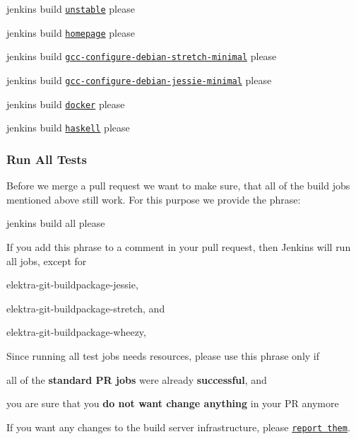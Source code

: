 \begin{DoxyItemize}
\item jenkins build \href{https://build.libelektra.org/job/elektra-mergerequests-unstable/}{\tt unstable} please
\item jenkins build \href{https://build.libelektra.org/job/elektra-homepage/}{\tt homepage} please
\item jenkins build \href{https://build.libelektra.org/job/elektra-gcc-configure-debian-stretch-minimal/}{\tt gcc-\/configure-\/debian-\/stretch-\/minimal} please
\item jenkins build \href{https://build.libelektra.org/job/elektra-gcc-configure-debian-jessie-minimal/}{\tt gcc-\/configure-\/debian-\/jessie-\/minimal} please
\item jenkins build \href{https://build.libelektra.org/job/test-docker/}{\tt docker} please
\item jenkins build \href{https://build.libelektra.org/job/elektra-haskell/}{\tt haskell} please
\end{DoxyItemize}

\subsubsection*{Run All Tests}

Before we merge a pull request we want to make sure, that all of the build jobs mentioned above still work. For this purpose we provide the phrase\+:


\begin{DoxyCode}
jenkins build all please
\end{DoxyCode}


If you add this phrase to a comment in your pull request, then Jenkins will run all jobs, except for


\begin{DoxyItemize}
\item {\ttfamily elektra-\/git-\/buildpackage-\/jessie},
\item {\ttfamily elektra-\/git-\/buildpackage-\/stretch}, and
\item {\ttfamily elektra-\/git-\/buildpackage-\/wheezy},
\end{DoxyItemize}

Since running all test jobs needs resources, please use this phrase only if


\begin{DoxyItemize}
\item all of the {\bfseries standard PR jobs} were already {\bfseries successful}, and
\item you are sure that you {\bfseries do not want change anything} in your PR anymore
\end{DoxyItemize}

If you want any changes to the build server infrastructure, please \href{https://issues.libelektra.org/160}{\tt report them}. 